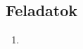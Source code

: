 \documentclass{szb-practice}
\begin{document}
\clearpage
\subsection{Feladatok}

\begin{enumerate}
  \item


\end{enumerate}
\end{document}
